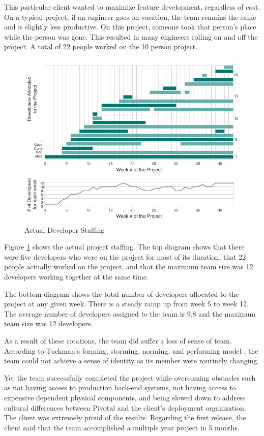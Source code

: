 This particular client wanted to maximize feature development, regardless of cost. On a typical project, if an engineer goes on vacation, the team remains the same and is slightly less productive. On this project, someone took that person's place while the person was gone. This resulted in many engineers rolling on and off the project. A total of 22 people worked on the 10 person project.

\begin{figure}[t]
\centering
\includegraphics[width=7.1in]{DeveloperStaffingV4.jpg}
\caption{Actual Developer Staffing}
\label{DeveloperStaffing}
\end{figure}

Figure \ref{DeveloperStaffing} shows the actual project staffing.  The top diagram shows that there were five developers who were on the project for most of its duration, that 22 people actually worked on the project, and that the maximum team size was 12 developers working together at the same time.

The bottom diagram shows the total number of developers allocated to the project at any given week. There is a steady ramp up from week 5 to week 12. The average number of developers assigned to the team is 9.8 and the maximum team size was 12 developers.

As a result of these rotations, the team did suffer a loss of sense of team. According to Tuckman's forming, storming, norming, and performing model \cite{TuckmanModel}, the team could not achieve a sense of identity as its member were routinely changing. 

Yet the team successfully completed the project while overcoming obstacles such as not having access to production back-end systems, not having access to expensive dependent physical components, and being slowed down to address cultural differences between Pivotal and the client's deployment organization. The client was extremely proud of the results. Regarding the first release, the client said that the team accomplished a multiple year project in 5 months. 

